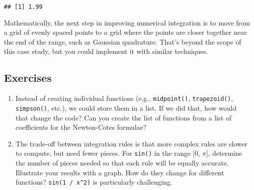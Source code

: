 \begin{verbatim}
## [1] 1.99
\end{verbatim}

Mathematically, the next step in improving numerical integration is to
move from a grid of evenly spaced points to a grid where the points are
closer together near the end of the range, such as Gaussian quadrature.
That's beyond the scope of this case study, but you could implement it
with similar techniques.

\hypertarget{exercises-3}{%
\subsection{Exercises}\label{exercises-3}}

\begin{enumerate}
\def\labelenumi{\arabic{enumi}.}
\item
  Instead of creating individual functions (e.g., \texttt{midpoint()},
  \texttt{trapezoid()}, \texttt{simpson()}, etc.), we could store them
  in a list. If we did that, how would that change the code? Can you
  create the list of functions from a list of coefficients for the
  Newton-Cotes formulae?
\item
  The trade-off between integration rules is that more complex rules are
  slower to compute, but need fewer pieces. For \texttt{sin()} in the
  range {[}0, \(\pi\){]}, determine the number of pieces needed so that
  each rule will be equally accurate. Illustrate your results with a
  graph. How do they change for different functions?
  \texttt{sin(1\ /\ x\^{}2)} is particularly challenging.
\end{enumerate}
